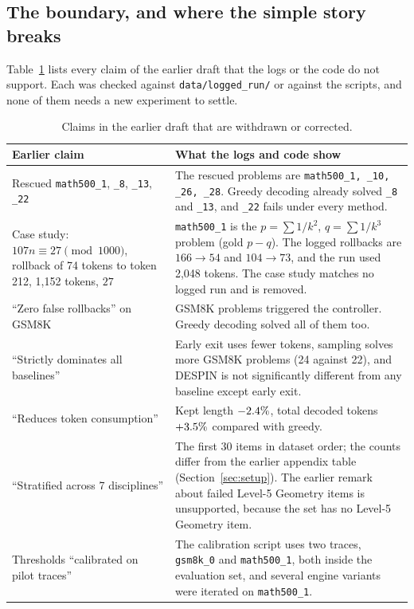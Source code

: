 \documentclass[11pt]{article}
\begin{document}
\subsection{The boundary, and where the simple story breaks}\label{sec:boundary}

Table~\ref{tab:corrections} lists every claim of the earlier draft that the logs or the code do not support. Each was checked against \texttt{data/logged\_run/} or against the scripts, and none of them needs a new experiment to settle.

\begin{table}[t]
\centering
\caption{Claims in the earlier draft that are withdrawn or corrected.}
\label{tab:corrections}
\footnotesize
\begin{tabularx}{\textwidth}{>{\raggedright\arraybackslash}p{4.3cm}X}
\toprule
Earlier claim & What the logs and code show \\
\midrule
Rescued \texttt{math500\_1}, \texttt{\_8}, \texttt{\_13}, \texttt{\_22} & The rescued problems are \texttt{math500\_1, \_10, \_26, \_28}. Greedy decoding already solved \texttt{\_8} and \texttt{\_13}, and \texttt{\_22} fails under every method. \\
Case study: $107n\equiv27 \pmod{1000}$, rollback of 74 tokens to token 212, 1{,}152 tokens, $\boxed{27}$ & \texttt{math500\_1} is the $p=\sum 1/k^2$, $q=\sum1/k^3$ problem (gold $p-q$). The logged rollbacks are $166\to54$ and $104\to73$, and the run used 2{,}048 tokens. The case study matches no logged run and is removed. \\
``Zero false rollbacks'' on GSM8K & \statTrigGsm{} GSM8K problems triggered the controller. Greedy decoding solved all of them too. \\
``Strictly dominates all baselines'' & Early exit uses fewer tokens, sampling solves more GSM8K problems (24 against 22), and DESPIN is not significantly different from any baseline except early exit. \\
``Reduces token consumption'' & Kept length $-2.4\%$, total decoded tokens $+3.5\%$ compared with greedy. \\
``Stratified across 7 disciplines'' & The first 30 items in dataset order; the counts differ from the earlier appendix table (Section~\ref{sec:setup}). The earlier remark about failed Level-5 Geometry items is unsupported, because the set has no Level-5 Geometry item. \\
Thresholds ``calibrated on pilot traces'' & The calibration script uses two traces, \texttt{gsm8k\_0} and \texttt{math500\_1}, both inside the evaluation set, and several engine variants were iterated on \texttt{math500\_1}. \\

\end{tabularx}
\end{table}
\end{document}

